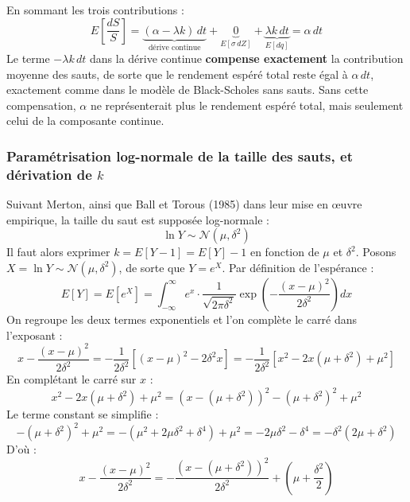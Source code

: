 \documentclass{article}
\begin{document}
En sommant les trois contributions :
\begin{equation}
E\left[\frac{dS}{S}\right] = \underbrace{(\alpha-\lambda k)\, dt}_{\text{dérive continue}} + \underbrace{0}_{E[\sigma\, dZ]} + \underbrace{\lambda k\, dt}_{E[dq]} = \alpha\, dt
\end{equation}
Le terme $-\lambda k\, dt$ dans la dérive continue \textbf{compense exactement} la contribution moyenne des sauts, de sorte que le rendement espéré total reste égal à $\alpha\, dt$, exactement comme dans le modèle de Black-Scholes sans sauts. Sans cette compensation, $\alpha$ ne représenterait plus le rendement espéré total, mais seulement celui de la composante continue.
\subsubsection*{Paramétrisation log-normale de la taille des sauts, et dérivation de $k$}
Suivant Merton, ainsi que Ball et Torous (1985) dans leur mise en \oe uvre empirique, la taille du saut est supposée log-normale :
\begin{equation}
\ln Y \sim \mathcal{N}(\mu, \delta^2)
\end{equation}
Il faut alors exprimer $k = E[Y-1] = E[Y] - 1$ en fonction de $\mu$ et $\delta^2$.
Posons $X = \ln Y \sim \mathcal{N}(\mu,\delta^2)$, de sorte que $Y = e^X$. Par définition de l'espérance :
\begin{equation}
E[Y] = E[e^X] = \int_{-\infty}^{\infty} e^x \cdot \frac{1}{\sqrt{2\pi\delta^2}} \exp\left(-\frac{(x-\mu)^2}{2\delta^2}\right) dx
\end{equation}
On regroupe les deux termes exponentiels et l'on complète le carré dans l'exposant :
\begin{equation}
x - \frac{(x-\mu)^2}{2\delta^2} = -\frac{1}{2\delta^2}\left[(x-\mu)^2 - 2\delta^2 x\right] = -\frac{1}{2\delta^2}\left[x^2 - 2x(\mu+\delta^2) + \mu^2\right]
\end{equation}
En complétant le carré sur $x$ :
\begin{equation}
x^2 - 2x(\mu+\delta^2) + \mu^2 = \left(x - (\mu+\delta^2)\right)^2 - (\mu+\delta^2)^2 + \mu^2
\end{equation}
Le terme constant se simplifie :
\begin{equation}
-(\mu+\delta^2)^2 + \mu^2 = -\left(\mu^2 + 2\mu\delta^2+\delta^4\right) + \mu^2 = -2\mu\delta^2 - \delta^4 = -\delta^2(2\mu+\delta^2)
\end{equation}
D'où :
\begin{equation}
x - \frac{(x-\mu)^2}{2\delta^2} = -\frac{\left(x-(\mu+\delta^2)\right)^2}{2\delta^2} + \left(\mu + \frac{\delta^2}{2}\right)
\end{equation}
\end{document}

